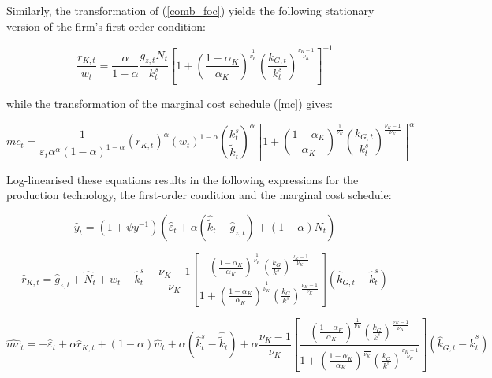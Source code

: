 \documentclass[a4paper,11pt]{article}
\numberwithin{equation}{section}
\begin{document}
	Similarly, the transformation of (\ref{comb_foc}) yields the following stationary version of the firm's first order condition:
	
	\begin{equation}
	\frac{r_{K,t}}{w_t}=\frac{\alpha}{1-\alpha}\frac{g_{z,t}N_t}{k_t^s}\left[1+\left(\frac{1-\alpha_K}{\alpha_K}\right)^{\frac{1}{\nu_K}}\left(\frac{k_{G,t}}{k_t^s}\right)^{\frac{\nu_K-1}{\nu_K}}\right]^{-1}
	\end{equation}
	
	while the transformation of the marginal cost schedule (\ref{mc}) gives:
	
	\begin{equation}
	mc_t=\frac{1}{\varepsilon_t\alpha^{\alpha}(1-\alpha)^{1-\alpha}}\left(r_{K,t}\right)^{\alpha}\left(w_t\right)^{1-\alpha}\left(\frac{k_t^s}{\tilde{k}_t}\right)^{\alpha}\left[1+\left(\frac{1-\alpha_K}{\alpha_K}\right)^{\frac{1}{\nu_K}}\left(\frac{k_{G,t}}{k_t^s}\right)^{\frac{\nu_K-1}{\nu_K}}\right]^{\alpha}
	\end{equation}
	
	Log-linearised these equations results in the following expressions for the production technology, the first-order condition and the marginal cost schedule:
	
	\begin{equation}
	\hat{y}_t=\left(1+\psi y^{-1}\right)\left(\hat{\varepsilon}_t+\alpha\left(\hat{\tilde{k}}_t-\hat{g}_{z,t}\right)+\left(1-\alpha\right)N_t\right)
	\end{equation}
	
	\begin{equation}
	\hat{r}_{K,t}=\hat{g}_{z,t}+\hat{N}_t+\hat{w}_t-\hat{k}_t^s-\frac{\nu_K-1}{\nu_K}\left[\frac{\left(\frac{1-\alpha_K}{\alpha_K}\right)^{\frac{1}{\nu_K}}\left(\frac{k_G}{k^s}\right)^{\frac{\nu_K-1}{\nu_K}}}{1+\left(\frac{1-\alpha_K}{\alpha_K}\right)^{\frac{1}{\nu_K}}\left(\frac{k_G}{k^s}\right)^{\frac{\nu_K-1}{\nu_K}}}\right]\left(\hat{k}_{G,t}-\hat{k}_t^s\right)
	\end{equation}
	
	\begin{equation}
	\hat{mc}_t=-\hat{\varepsilon}_t+\alpha\hat{r}_{K,t}+(1-\alpha)\hat{w}_t+\alpha\left(\hat{k}_t^s-\hat{\tilde{k}}_t\right)+\alpha\frac{\nu_K-1}{\nu_K}\left[\frac{\left(\frac{1-\alpha_K}{\alpha_K}\right)^{\frac{1}{\nu_K}}\left(\frac{k_G}{k^s}\right)^{\frac{\nu_K-1}{\nu_K}}}{1+\left(\frac{1-\alpha_K}{\alpha_K}\right)^{\frac{1}{\nu_K}}\left(\frac{k_G}{k^s}\right)^{\frac{\nu_K-1}{\nu_K}}}\right]\left(\hat{k}_{G,t}-\hat{k}_t^s\right)
	\end{equation}
	
\end{document}
